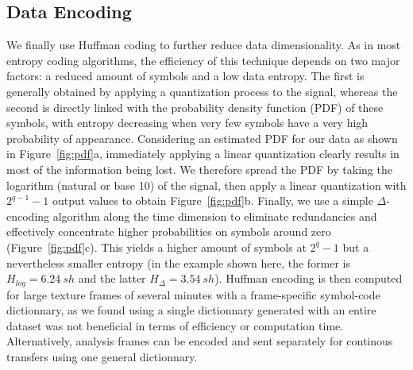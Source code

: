 \documentclass[preprint,12pt]{elsarticle}
\begin{document}
\subsection{Data Encoding}
We finally use Huffman coding to further reduce data dimensionality. As in most entropy coding algorithms, the efficiency of this technique depends on two major factors: a reduced amount of symbols and a low data entropy. The first is generally obtained by applying a quantization process to the signal, whereas the second is directly linked with the probability density function (PDF) of these symbols, with entropy decreasing when very few symbols have a very high probability of appearance. Considering an estimated PDF for our data as shown in Figure~\ref{fig:pdf}a, immediately applying a linear quantization clearly results in most of the information being lost. We therefore spread the PDF by taking the logarithm (natural or base 10) of the signal, then apply a linear quantization with $2^{q-1}-1$ output values to obtain Figure~\ref{fig:pdf}b. Finally, we use a simple $\Delta$-encoding algorithm along the time dimension to eliminate redundancies and effectively concentrate higher probabilities on symbols around zero (Figure~\ref{fig:pdf}c). This yields a higher amount of symbols at $2^q-1$ but a nevertheless smaller entropy (in the example shown here, the former is $H_{log} = 6.24~sh$ and the latter $H_{\Delta} = 3.54~sh$). Huffman encoding is then computed for large texture frames of several minutes with a frame-specific symbol-code dictionnary, as we found using a single dictionnary generated with an entire dataset was not beneficial in terms of efficiency or computation time. Alternatively, analysis frames can be encoded and sent separately for continous transfers using one general dictionnary.\\
\end{document}
